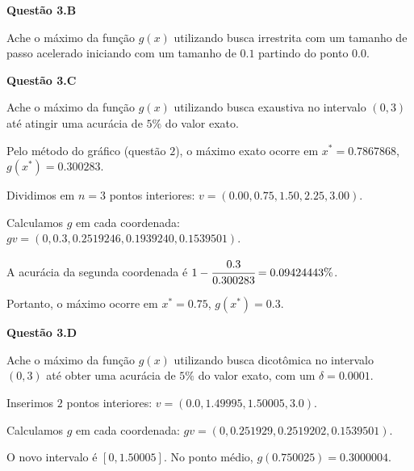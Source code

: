 \documentclass{rbfin}
\begin{document}
\textbf{Questão 3.B}

\normalsize

\vspace{6mm}

\doublespacing

Ache o máximo da função $g(x)$ utilizando busca irrestrita com um tamanho de passo acelerado iniciando com um tamanho de $0.1$ partindo do ponto $0.0$.

\singlespacing

\vspace{6mm}

\large

\textbf{Questão 3.C}

\normalsize

\vspace{6mm}

\doublespacing

Ache o máximo da função $g(x)$ utilizando busca exaustiva no intervalo $(0, 3)$ até atingir uma acurácia de $5\%$ do valor exato.

Pelo método do gráfico (questão $2$), o máximo exato ocorre em $x^* = 0.7867868$, $g(x^*) = 0.300283$.

Dividimos em $n = 3$ pontos interiores: $v = (0.00, 0.75, 1.50, 2.25, 3.00)$.

Calculamos $g$ em cada coordenada: $gv = (0, 0.3, 0.2519246, 0.1939240, 0.1539501)$.

A acurácia da segunda coordenada é $1 - \cfrac{0.3}{0.300283} = 0.09424443\%$.

Portanto, o máximo ocorre em $x^* = 0.75$, $g(x^*) = 0.3$.

\singlespacing

\vspace{6mm}

\large

\textbf{Questão 3.D}

\normalsize

\vspace{6mm}

\doublespacing

Ache o máximo da função $g(x)$ utilizando busca dicotômica no intervalo $(0, 3)$ até obter uma acurácia de $5\%$ do valor exato, com um $\delta = 0.0001$.

Inserimos $2$ pontos interiores: $v = (0.0, 1.49995, 1.50005, 3.0)$.

Calculamos $g$ em cada coordenada: $gv = (0, 0.251929, 0.2519202, 0.1539501)$.

O novo intervalo é $[0, 1.50005]$. No ponto médio, $g(0.750025) = 0.3000004$.
\end{document}
